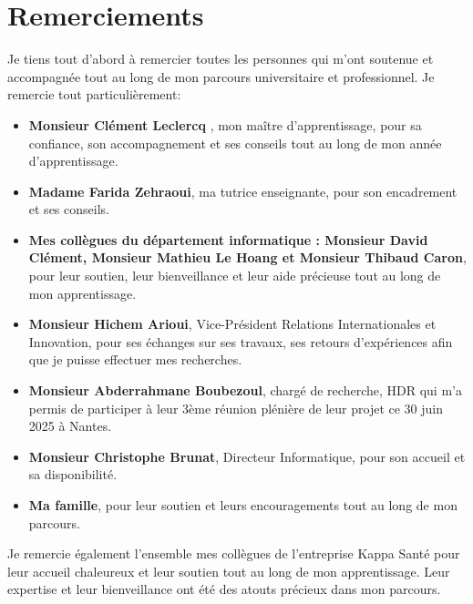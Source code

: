 \section{Remerciements}
Je tiens tout d'abord à remercier toutes les personnes qui m'ont soutenue et accompagnée tout au long de mon parcours universitaire et professionnel. 
Je remercie tout particulièrement: \
\begin{itemize}
    \item \textbf{Monsieur Clément Leclercq }, mon maître d'apprentissage, pour sa confiance, son accompagnement et ses conseils tout au long de mon année d'apprentissage.
    \item \textbf{Madame Farida Zehraoui}, ma tutrice enseignante, pour son encadrement et ses conseils.
     \item \textbf{Mes collègues du département informatique : Monsieur David Clément, Monsieur Mathieu Le Hoang et Monsieur Thibaud Caron}, pour leur soutien, leur bienveillance et leur aide précieuse tout au long de mon apprentissage.
    \item \textbf{Monsieur Hichem Arioui}, Vice-Président Relations Internationales et Innovation, pour ses échanges sur ses travaux, ses retours d'expériences afin que je puisse effectuer mes recherches.
    \item \textbf{Monsieur Abderrahmane Boubezoul}, chargé de recherche, HDR qui m'a permis de participer à leur 3ème réunion plénière de leur projet ce 30 juin 2025 à Nantes.
    \item \textbf{Monsieur Christophe Brunat}, Directeur Informatique, pour son accueil et sa disponibilité.
    \item \textbf{Ma famille}, pour leur soutien et leurs encouragements tout au long de mon parcours.
\end{itemize}
Je remercie également l'ensemble mes collègues de l'entreprise Kappa Santé pour leur accueil chaleureux et leur soutien tout au long de mon apprentissage. Leur expertise et leur bienveillance ont été des atouts précieux dans mon parcours.